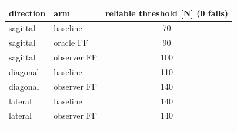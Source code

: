 \begin{tabular}{llc}
\toprule
direction & arm & reliable threshold [N] (0 falls) \\
\midrule
sagittal & baseline & 70 \\
sagittal & oracle FF & 90 \\
sagittal & observer FF & 100 \\
\addlinespace
diagonal & baseline & 110 \\
diagonal & observer FF & 140 \\
\addlinespace
lateral & baseline & 140 \\
lateral & observer FF & 140 \\
\addlinespace
\bottomrule
\end{tabular}
